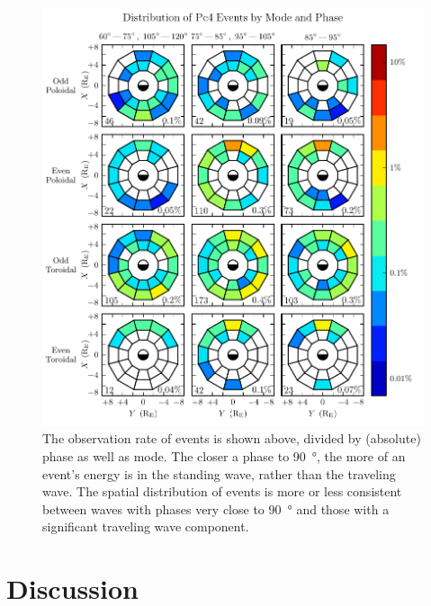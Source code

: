 \begin{figure}[!htb]
    \centering
    \includegraphics[width=\textwidth]{figures/mode_phase.pdf}
    \caption[Rate of Pc4 Events by Mode and Phase]{
      The observation rate of events is shown above, divided by (absolute) phase as well as mode. The closer a phase to \SI{90}{\degree}, the more of an event's energy is in the standing wave, rather than the traveling wave. The spatial distribution of events is more or less consistent between waves with phases very close to \SI{90}{\degree} and those with a significant traveling wave component. 
    }
    \label{fig_mode_phase}
\end{figure}

\section{Discussion}


